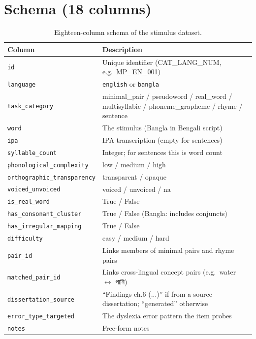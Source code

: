 \section*{Schema (18 columns)}

\begin{table}[H]
\centering
\small
\renewcommand{\arraystretch}{1.5}
\begin{tabularx}{\textwidth}{|l|X|}
\hline
\textbf{Column} & \textbf{Description} \\
\hline
\texttt{id}                       & Unique identifier (CAT\_LANG\_NUM, e.g.\ MP\_EN\_001) \\
\hline
\texttt{language}                 & \texttt{english} or \texttt{bangla} \\
\hline
\texttt{task\_category}           & minimal\_pair / pseudoword / real\_word / multisyllabic / phoneme\_grapheme / rhyme / sentence \\
\hline
\texttt{word}                     & The stimulus (Bangla in Bengali script) \\
\hline
\texttt{ipa}                      & IPA transcription (empty for sentences) \\
\hline
\texttt{syllable\_count}          & Integer; for sentences this is word count \\
\hline
\texttt{phonological\_complexity} & low / medium / high \\
\hline
\texttt{orthographic\_transparency} & transparent / opaque \\
\hline
\texttt{voiced\_unvoiced}         & voiced / unvoiced / na \\
\hline
\texttt{is\_real\_word}           & True / False \\
\hline
\texttt{has\_consonant\_cluster}  & True / False (Bangla: includes conjuncts) \\
\hline
\texttt{has\_irregular\_mapping}  & True / False \\
\hline
\texttt{difficulty}               & easy / medium / hard \\
\hline
\texttt{pair\_id}                 & Links members of minimal pairs and rhyme pairs \\
\hline
\texttt{matched\_pair\_id}        & Links cross-lingual concept pairs (e.g.\ water $\leftrightarrow$ {\banglafont পানি}) \\
\hline
\texttt{dissertation\_source}     & ``Findings ch.6 (...)'' if from a source dissertation; ``generated'' otherwise \\
\hline
\texttt{error\_type\_targeted}    & The dyslexia error pattern the item probes \\
\hline
\texttt{notes}                    & Free-form notes \\
\hline
\end{tabularx}
\caption{Eighteen-column schema of the stimulus dataset.}
\end{table}

